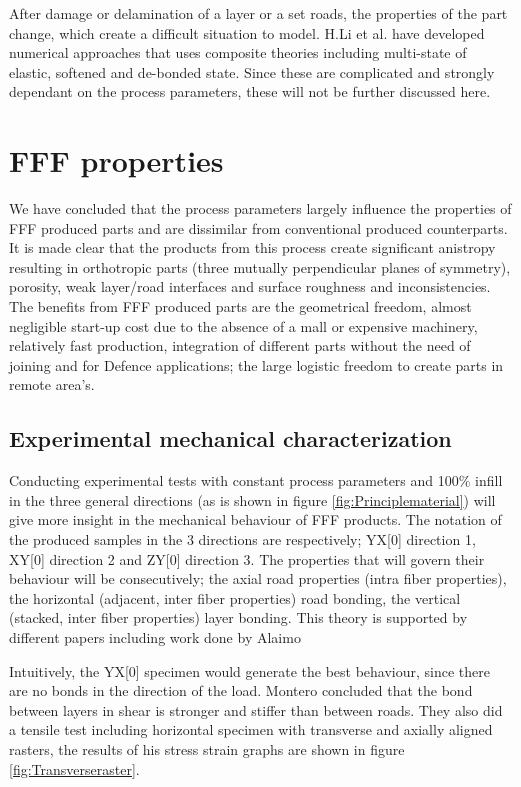 After damage or delamination of a layer or a set roads, the properties of the part change, which create a difficult situation to model. H.Li et al. \cite{Li2002CompositeProperties} have developed numerical approaches that uses composite theories including multi-state of elastic, softened and de-bonded state.  Since these are complicated and strongly dependant on the process parameters, these will not be further discussed here. 


\section{FFF properties}
    \label{chp:FFF properties}
We have concluded that the process parameters largely influence the properties of FFF produced parts and are dissimilar from conventional produced counterparts. It is made clear that the products from this process create significant anistropy resulting in orthotropic parts (three mutually perpendicular planes of symmetry), porosity, weak layer/road interfaces and surface roughness and inconsistencies. The benefits from FFF produced parts are the geometrical freedom, almost negligible start-up cost due to the absence of a mall or expensive machinery, relatively fast production, integration of different parts without the need of joining and for Defence applications; the large logistic freedom to create parts in remote area's.

\subsection{Experimental mechanical characterization}
Conducting experimental tests with constant process parameters and 100\% infill in the three general directions (as is shown in figure \ref{fig:Principlematerial}) will give more insight in the mechanical behaviour of FFF products. The notation of the produced samples in the 3 directions are respectively; YX[0] direction 1, XY[0] direction 2 and ZY[0] direction 3. The properties that will govern their behaviour will be consecutively; the axial road properties (intra fiber properties), the horizontal (adjacent, inter fiber properties) road bonding, the vertical (stacked, inter fiber properties) layer bonding. This theory is supported by different papers including work done by Alaimo \cite{Alaimo2017InfluenceParts}

Intuitively, the YX[0] specimen would generate the best behaviour, since there are no bonds in the direction of the load. Montero \cite{Montero2001MaterialExperiments} concluded that the bond between layers in shear is stronger and stiffer  than between roads. They also did a tensile test including horizontal specimen with transverse and axially aligned rasters, the results of his stress strain graphs are shown in figure \ref{fig:Transverseraster}. 


